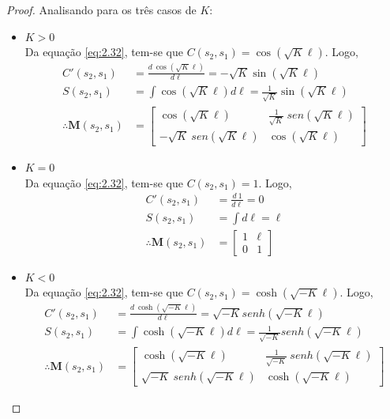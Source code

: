 \begin{proof}Analisando para os três casos de $K$:
	\begin{itemize}
	\item $K>0$\\
	
	Da equação \eqref{eq:2.32}, tem-se que $C(s_2,s_1) = \cos(\sqrt{K}\ell)$. Logo,
	\begin{align*}
        C'(s_2,s_1) &= \frac{d\ \cos(\sqrt{K}\ell)}{d\ell} = -\sqrt{K}\sin(\sqrt{K}\ell)\\
        S(s_2,s_1) &= \int \cos(\sqrt{K}\ell)d\ell = \frac{1}{\sqrt{K}}\sin(\sqrt{K}\ell)\\
        \therefore \boldsymbol{M}(s_2,s_1) &= \begin{bmatrix}
            \cos(\sqrt{K}\ell) & \frac{1}{\sqrt{K}}\ sen(\sqrt{K}\ell)\\
            -\sqrt{K}\ sen(\sqrt{K}\ell) & \cos(\sqrt{K}\ell)
            \end{bmatrix}
	\end{align*}
	\item $K=0$\\
	
	Da equação \eqref{eq:2.32}, tem-se que $C(s_2,s_1) = 1$. Logo,
	\begin{align*}
		C'(s_2,s_1) &= \frac{d \ 1}{d\ell} = 0\\
		S(s_2,s_1) &= \int d\ell = \ell\\
		\therefore \boldsymbol{M}(s_2,s_1) &= \begin{bmatrix}
				1 & \ell\\
				0 & 1
				\end{bmatrix}
	\end{align*}
	\item $K<0$\\
	
	Da equação \eqref{eq:2.32}, tem-se que $C(s_2,s_1) = \cosh(\sqrt{-K}\ell)$. Logo,
		\begin{align*}
        	C'(s_2,s_1) &= \frac{d\ \cosh(\sqrt{-K}\ell)}{d\ell} = \sqrt{-K}senh(\sqrt{-K}\ell)\\
            S(s_2,s_1) &= \int \cosh(\sqrt{-K}\ell)d\ell = \frac{1}{\sqrt{-K}}senh(\sqrt{-K}\ell)\\
            \therefore \boldsymbol{M}(s_2,s_1) &= \begin{bmatrix}
            \cosh(\sqrt{-K}\ell) & \frac{1}{\sqrt{-K}}\ senh(\sqrt{-K}\ell)\\
            \sqrt{-K}\ senh(\sqrt{-K}\ell) & \cosh(\sqrt{-K}\ell)
            \end{bmatrix}
		\end{align*}
	\end{itemize}
\end{proof}
	
